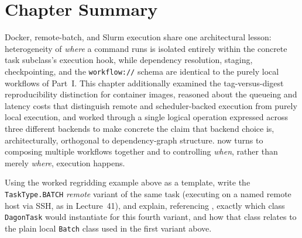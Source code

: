 \section{Chapter Summary}

Docker, remote-batch, and Slurm execution share one architectural lesson:
heterogeneity of \emph{where} a command runs is isolated entirely within the
concrete task subclass's execution hook, while dependency resolution,
staging, checkpointing, and the \texttt{workflow://} schema are identical to
the purely local workflows of Part~I. This chapter additionally examined the
tag-versus-digest reproducibility distinction for container images, reasoned
about the queueing and latency costs that distinguish remote and
scheduler-backed execution from purely local execution, and worked through a
single logical operation expressed across three different backends to make
concrete the claim that backend choice is, architecturally, orthogonal to
dependency-graph structure.  now turns to composing
multiple workflows together and to controlling \emph{when}, rather than
merely \emph{where}, execution happens.

\begin{exercise}
Using the worked regridding example above as a template, write the
\texttt{TaskType.BATCH} \emph{remote} variant of the same task (executing on
a named remote host via SSH, as in Lecture~41), and explain, referencing
, exactly which class \texttt{DagonTask}
would instantiate for this fourth variant, and how that class relates to
the plain local \texttt{Batch} class used in the first variant above.
\end{exercise}
